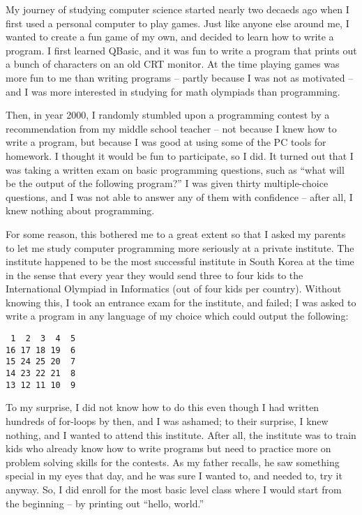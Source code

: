 


My journey of studying computer science started nearly two decaeds ago when I first used a personal computer to play games. Just like anyone else around me, I wanted to create a fun game of my own, and decided to learn how to write a program. I first learned QBasic, and it was fun to write a program that prints out a bunch of characters on an old CRT monitor. At the time playing games was more fun to me than writing programs -- partly because I was not as motivated -- and I was more interested in studying for math olympiads than programming.

Then, in year 2000, I randomly stumbled upon a programming contest by a recommendation from my middle school teacher -- not because I knew how to write a program, but because I was good at using some of the PC tools for homework. I thought it would be fun to participate, so I did. It turned out that I was taking a written exam on basic programming questions, such as ``what will be the output of the following program?'' I was given thirty multiple-choice questions, and I was not able to answer any of them with confidence  -- after all, I knew nothing about programming.

For some reason, this bothered me to a great extent so that I asked my parents to let me study computer programming more seriously at a private institute. The institute happened to be the most successful institute in South Korea at the time in the sense that every year they would send three to four kids to the International Olympiad in Informatics (out of four kids per country). Without knowing this, I took an entrance exam for the institute, and failed; I was asked to write a program in any language of my choice which could output the following:

\begin{verbatim}
 1  2  3  4  5
16 17 18 19  6
15 24 25 20  7
14 23 22 21  8
13 12 11 10  9
\end{verbatim}

To my surprise, I did not know how to do this even though I had written hundreds of for-loops by then, and I was ashamed; to their surprise, I knew nothing, and I wanted to attend this institute. After all, the institute was to train kids who already know how to write programs but need to practice more on problem solving skills for the contests. As my father recalls, he saw something special in my eyes that day, and he was sure I wanted to, and needed to, try it anyway. So, I did enroll for the most basic level class where I would start from the beginning -- by printing out ``hello, world.'' 

